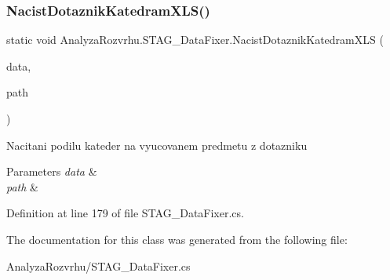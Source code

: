 \subsubsection{\texorpdfstring{Nacist\+Dotaznik\+Katedram\+X\+L\+S()}{NacistDotaznikKatedramXLS()}}
{\footnotesize\ttfamily static void Analyza\+Rozvrhu.\+S\+T\+A\+G\+\_\+\+Data\+Fixer.\+Nacist\+Dotaznik\+Katedram\+X\+LS (\begin{DoxyParamCaption}\item[{this \hyperlink{class_analyza_rozvrhu_1_1_s_t_a_g___classes_1_1_s_t_a_g___database}{S\+T\+A\+G\+\_\+\+Classes.\+S\+T\+A\+G\+\_\+\+Database}}]{data,  }\item[{string}]{path }\end{DoxyParamCaption})\hspace{0.3cm}{\ttfamily [static]}}



Nacitani podilu kateder na vyucovanem predmetu z dotazniku 


\begin{DoxyParams}{Parameters}
{\em data} & \\
\hline
{\em path} & \\
\hline
\end{DoxyParams}


Definition at line 179 of file S\+T\+A\+G\+\_\+\+Data\+Fixer.\+cs.



The documentation for this class was generated from the following file\+:\begin{DoxyCompactItemize}
\item 
Analyza\+Rozvrhu/S\+T\+A\+G\+\_\+\+Data\+Fixer.\+cs\end{DoxyCompactItemize}
